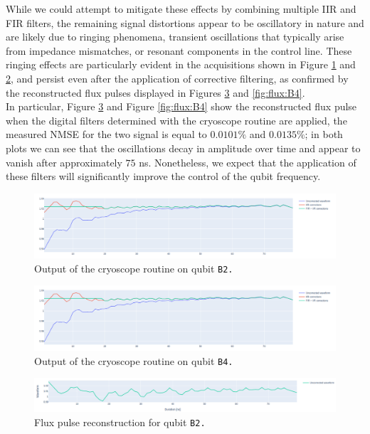 While we could attempt to mitigate these effects by combining multiple IIR and FIR filters, the remaining signal distortions appear to be oscillatory in nature and are likely due to ringing phenomena, transient oscillations that typically arise from impedance mismatches, or resonant components in the control line.
These ringing effects are particularly evident in the acquisitions shown in Figure \ref{fig:cryoscope:B2} and \ref{fig:cryoscope:B4}, and persist even after the application of corrective filtering, as confirmed by the reconstructed flux pulses displayed in Figures \ref{fig:flux:B2} and \ref{fig:flux:B4}.\\
In particular, Figure \ref{fig:flux:B2} and Figure \ref{fig:flux:B4} show the reconstructed flux pulse when the digital filters determined with the cryoscope routine are applied, the measured NMSE for the two signal is equal to $0.0101\%$ and $0.0135\%$; in both plots we can see that the oscillations decay in amplitude over time and appear to vanish after approximately $75$ ns. 
Nonetheless, we expect that the application of these filters will significantly improve the control of the qubit frequency.

\begin{figure}[h!]
    \centering
    \includegraphics[width=\textwidth]{figures/png/Cryoscope/B2_ringing.png}
    \caption{Output of the cryoscope routine on qubit \tt{B2}.}
    \label{fig:cryoscope:B2}
\end{figure}

\begin{figure}[h!]
    \centering
    \includegraphics[width=\textwidth]{figures/png/Cryoscope/B2_ringing.png}
    \caption{Output of the cryoscope routine on qubit \tt{B4}.}
    \label{fig:cryoscope:B4}
\end{figure} 

\begin{figure}[h!]
    \centering
    \includegraphics[width=\textwidth]{figures/png/Cryoscope/flux_B2.png}
    \caption{Flux pulse reconstruction for qubit \tt{B2}.}
    \label{fig:flux:B2}
\end{figure}

